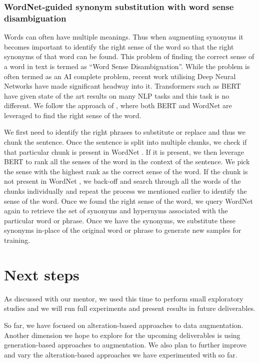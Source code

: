 \documentclass[11pt,a4paper]{article}
\begin{document}
\subsubsection{WordNet-guided synonym substitution with word sense disambiguation}

Words can often have multiple meanings. Thus when augmenting synonyms it becomes important to identify the right sense of the word so that the right synonyms of that word can be found. This problem of finding the correct sense of a word in text is termed as ``Word Sense Disambiguation''. While the problem is often termed as an AI complete problem, recent work utilising Deep Neural Networks have made significant headway into it. Transformers such as BERT \cite{devlin2018bert} have given state of the art results on many NLP tasks and this task is no different. We follow  the approach  of \citet{yap-etal-2020-adapting}, where both BERT and WordNet \cite{WordNet} are leveraged to find the right sense of the word. 

	We first need to identify the right phrases to substitute or replace and thus we chunk the sentence. Once the sentence is split into multiple chunks, we check if that particular chunk is present in WordNet . If it is present, we then leverage BERT to rank all the senses of the word in the context of the sentence. We pick the sense with the highest rank as the correct sense of the word. If the chunk is not present in WordNet , we back-off and search through all the words of the chunks individually and repeat the process we mentioned earlier to identify the sense of the word. Once we found the right sense of the word, we query WordNet again to retrieve the set of synonyms and hypernyms associated with the particular word or phrase. Once we have the synonyms, we substitute these synonyms in-place of the original word or phrase to generate new samples for training. 

\section{Next steps}
As discussed with our mentor, we used this time to perform small exploratory studies and we will run full experiments and present results in future deliverables.

So far, we have focused on alteration-based approaches to data augmentation. Another dimension we hope to explore for the upcoming deliverables is using generation-based approaches to augmentation. We also plan to further improve and vary the alteration-based approaches we have experimented with so far.
\end{document}
